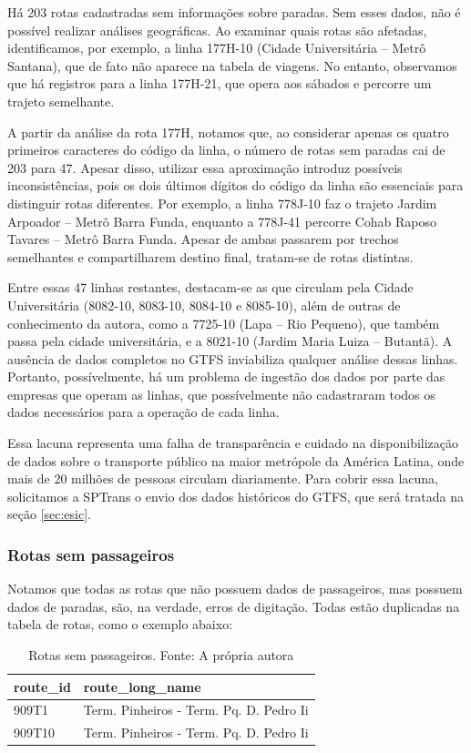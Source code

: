 Há 203 rotas cadastradas sem informações sobre  paradas. Sem esses dados, não é possível realizar análises geográficas. Ao examinar quais rotas são afetadas, identificamos, por exemplo, a linha 177H-10 (Cidade Universitária – Metrô Santana), que de fato não aparece na tabela de viagens. No entanto, observamos que há registros para a linha 177H-21, que opera aos sábados e percorre um trajeto semelhante.

A partir da análise da rota 177H, notamos que, ao considerar apenas os quatro primeiros caracteres do código da linha, o número de rotas sem paradas cai de 203 para 47. Apesar disso, utilizar essa aproximação introduz possíveis inconsistências, pois os dois últimos dígitos do código da linha são essenciais para distinguir rotas diferentes. Por exemplo, a linha 778J-10 faz o trajeto Jardim Arpoador – Metrô Barra Funda, enquanto a 778J-41 percorre Cohab Raposo Tavares – Metrô Barra Funda. Apesar de ambas passarem por trechos semelhantes e compartilharem destino final, tratam-se de rotas distintas. 

Entre essas 47 linhas restantes, destacam-se as que circulam pela Cidade Universitária (8082-10, 8083-10, 8084-10 e 8085-10), além de outras de conhecimento da autora, como a 7725-10 (Lapa – Rio Pequeno), que também passa pela cidade universitária, e a 8021-10 (Jardim Maria Luiza – Butantã). A ausência de dados completos no GTFS inviabiliza qualquer análise dessas linhas. Portanto, possívelmente, há um problema de ingestão dos dados por parte das empresas que operam as linhas, que possívelmente não cadastraram todos os dados necessários para a operação de cada linha.

Essa lacuna representa uma falha de transparência e cuidado na disponibilização de dados sobre o transporte público na maior metrópole da América Latina, onde mais de 20 milhões de pessoas circulam diariamente. Para cobrir essa lacuna, solicitamos a SPTrans o envio dos dados históricos do GTFS, que será tratada na seção \ref{sec:esic}.

\subsubsection{Rotas sem passageiros}

Notamos que todas as rotas que não possuem dados de passageiros, mas possuem dados de paradas, são, na verdade, erros de digitação. Todas estão duplicadas na tabela de rotas, como o exemplo abaixo:

\begin{table}
\centering
\begin{tabular}{ll}
\toprule
 route\_id &                        route\_long\_name \\
\midrule
909T1 & Term. Pinheiros - Term. Pq. D. Pedro Ii \\
909T10 & Term. Pinheiros - Term. Pq. D. Pedro Ii \\
\bottomrule
\end{tabular}
\caption{Rotas sem passageiros. Fonte: A própria autora}
\end{table}

